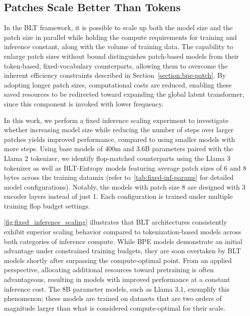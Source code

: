 \subsection{Patches Scale Better Than Tokens} In the {\textsc BLT} framework, it is possible to scale up both the model size and the patch size in parallel while holding the compute requirements for training and inference constant, along with the volume of training data. The capability to enlarge patch sizes without bound distinguishes patch-based models from their token-based, fixed-vocabulary counterparts, allowing them to overcome the inherent efficiency constraints described in Section~\ref{section:bpe-patch}. By adopting longer patch sizes, computational costs are reduced, enabling these saved resources to be redirected toward expanding the global latent transformer, since this component is invoked with lower frequency.

In this work, we perform a fixed inference scaling experiment to investigate whether increasing model size while reducing the number of steps over larger patches yields improved performance, compared to using smaller models with more steps. Using base models of 400m and 3.6B parameters paired with the Llama 2 tokenizer, we identify flop-matched counterparts using the Llama 3 tokenizer as well as {\textsc BLT}-Entropy models featuring average patch sizes of 6 and 8 bytes across the training datamix (refer to~\autoref{tab:fixed-inf-params} for detailed model configurations). Notably, the models with patch size 8 are designed with 3 encoder layers instead of just 1. Each configuration is trained under multiple training flop budget settings.

\autoref{fig:fixed_inference_scaling} illustrates that {\textsc BLT} architectures consistently exhibit superior scaling behavior compared to tokenization-based models across both categories of inference compute. While BPE models demonstrate an initial advantage under constrained training budgets, they are soon overtaken by {\textsc BLT} models shortly after surpassing the compute-optimal point. From an applied perspective, allocating additional resources toward pretraining is often advantageous, resulting in models with improved performance at a constant inference cost. The 8B parameter models, such as Llama 3.1, exemplify this phenomenon; these models are trained on datasets that are two orders of magnitude larger than what is considered compute-optimal for their scale.

